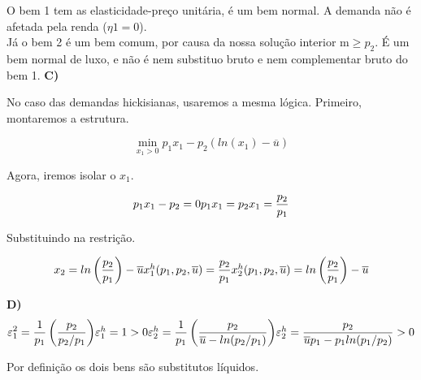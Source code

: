 \documentclass[a4paper, 12pt]{article} %
\begin{document}
\begin{flushleft}
O bem 1 tem as elasticidade-preço unitária, é um bem normal. A demanda não é afetada pela renda ($\eta{1} = 0 $).
\\
Já o bem 2 é um bem comum, por causa da nossa solução interior m$\geq p_{2}$. É um bem normal de luxo, e não é nem substituo bruto e nem complementar bruto do bem 1.
\singlespacing
\textbf{C)} 

\begin{center}
No caso das demandas hickisianas, usaremos a mesma lógica. Primeiro, montaremos a estrutura.
\end{center}

\begin{equation}
\min_{x_{1}>0} p_{1}x_{1} - p_{2}(ln(x_{1})- \overline{u} )
\end{equation}

\begin{center}
Agora, iremos isolar o $x_{1}$.
\end{center}


\begin{equation}
p_{1}x_{1} - p_{2} = 0
$$\\$$
p_{1}x_{1} = p_{2}
$$\\$$
x_{1} = \dfrac{p_{2}}{p_{1}}
\end{equation}

\begin{center}
Substituindo na restrição.
\end{center}

\begin{equation}
x_{2} = ln \left(\dfrac{p_{2}}{p_{1}} \right) - \overline{u} 
$$\\$$
x_{1}^h(p_{1},p_{2},\overline{u}) = \dfrac{p_{2}}{p_{1}}
$$\\$$
x_{2}^h(p_{1},p_{2},\overline{u}) =  ln \left(\dfrac{p_{2}}{p_{1}} \right) - \overline{u} 
\end{equation}
\singlespacing

\textbf{D)}
\\
\begin{equation}
\varepsilon_{1}^2 = \dfrac{1}{p_{1}} \left(\dfrac{p_{2}}{p_{2}/p_{1}} \right)
$$\\$$
\varepsilon_{1}^h = 1>0
$$\\$$
\varepsilon_{2}^h = \dfrac{1}{p_{1}} \left(\dfrac{p_{2}}{\overline{u}-ln(p_{2}/p_{1})} \right)
$$\\$$
\varepsilon_{2}^h = \dfrac{p_{2}}{\overline{u}p_{1} - p_{1}ln(p_{1}/p_{2})} > 0
\end{equation}
\begin{center}
Por definição os dois bens são substitutos líquidos.
\end{center}
\singlespacing


\end{flushleft}
\end{document}
